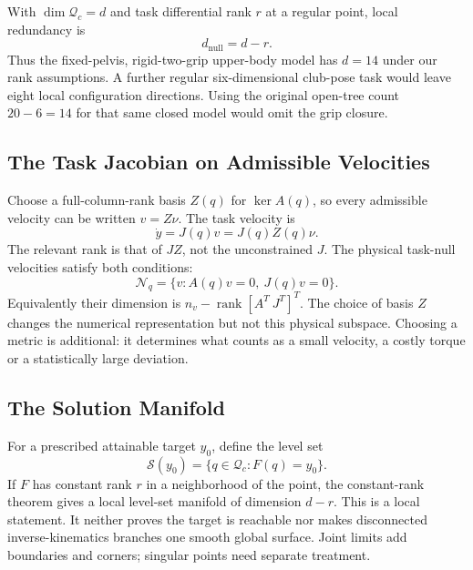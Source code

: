 With $\dim\mathcal Q_c=d$ and task differential rank $r$ at a regular point, local redundancy is
\begin{equation}
d_{\mathrm{null}}=d-r.
\label{eq:ch23_redundancy_dof}
\end{equation}
Thus the fixed-pelvis, rigid-two-grip upper-body model has $d=14$ under our rank assumptions. A further regular six-dimensional club-pose task would leave eight local configuration directions. Using the original open-tree count $20-6=14$ for that same closed model would omit the grip closure.

\subsection{The Task Jacobian on Admissible Velocities}
\label{def:ch23_null_space}

Choose a full-column-rank basis $Z(q)$ for $\ker A(q)$, so every admissible velocity can be written $v=Z\nu$. The task velocity is
\begin{equation}
\dot y=J(q)v=J(q)Z(q)\nu.
\label{eq:ch23_task_jacobian}
\end{equation}
The relevant rank is that of $JZ$, not the unconstrained $J$. The physical task-null velocities satisfy both conditions:
\begin{equation}
\mathcal N_q=\{v:A(q)v=0,\ J(q)v=0\}.
\label{eq:ch23_null_space_def}
\end{equation}
Equivalently their dimension is $n_v-\operatorname{rank}[A^T\ J^T]^T$. The choice of basis $Z$ changes the numerical representation but not this physical subspace. Choosing a metric is additional: it determines what counts as a small velocity, a costly torque or a statistically large deviation.

\subsection{The Solution Manifold}

For a prescribed attainable target $y_0$, define the level set
\begin{equation}
\mathcal S(y_0)=\{q\in\mathcal Q_c:F(q)=y_0\}.
\label{eq:ch23_solution_manifold}
\end{equation}
If $F$ has constant rank $r$ in a neighborhood of the point, the constant-rank theorem gives a local level-set manifold of dimension $d-r$.
\label{thm:ch23_manifold_dimension}
This is a local statement. It neither proves the target is reachable nor makes disconnected inverse-kinematics branches one smooth global surface. Joint limits add boundaries and corners; singular points need separate treatment.

